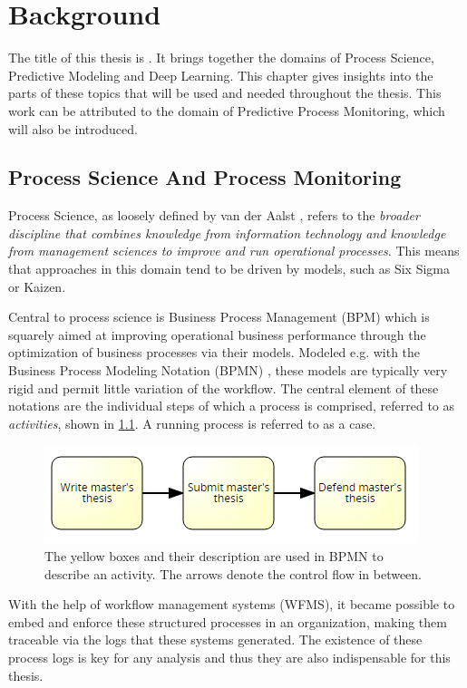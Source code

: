 \chapter{Background}\label{chap:background}
The title of this thesis is \textit{\myTitle}.
It brings together the domains of Process Science, Predictive Modeling and Deep Learning.
This chapter gives insights into the parts of these topics that will be used and needed throughout the thesis.
This work can be attributed to the domain of Predictive Process Monitoring, which will also be introduced.

\section{Process Science And Process Monitoring}
Process Science, as loosely defined by van der Aalst \cite{Aalst2016}, refers to the \textit{broader discipline that combines knowledge from information technology and knowledge from management sciences to improve and run operational processes}. This means that approaches in this domain tend to be driven by models, such as Six Sigma or Kaizen.

Central to process science is Business Process Management (BPM) which is squarely aimed at improving operational business performance through the optimization of business processes via their models.
Modeled e.g. with the Business Process Modeling Notation (BPMN) \cite{bpmn2.0}, these models are typically very rigid and permit little variation of the workflow. The central element of these notations are the individual steps of which a process is comprised, referred to as \textit{activities}, shown in \ref{fig:activity-introduction}. A running process is referred to as a case.

\begin{figure}
    \centering
    \includegraphics[width=.75\textwidth]{gfx/activity-introduction.png}
    \caption{The yellow boxes and their description are used in BPMN to describe an activity. The arrows denote the control flow in between.}
    \label{fig:activity-introduction}
\end{figure}

With the help of workflow management systems (WFMS), it became possible to embed and enforce these structured processes in an organization, making them traceable via the logs that these systems generated. The existence of these process logs is key for any analysis and thus they are also indispensable for this thesis.

